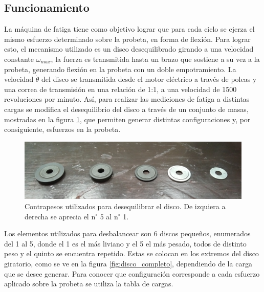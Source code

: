 \subsection{Funcionamiento}
\label{sec:funcionamiento}
La máquina de fatiga tiene como objetivo lograr que para cada ciclo se ejerza el mismo esfuerzo determinado sobre la probeta, en forma de flexión. Para lograr esto, el mecanismo utilizado es un disco desequilibrado girando a una velocidad constante $\omega_{max}$, la fuerza es transmitida hasta un brazo que sostiene a su vez a la probeta, generando flexión en la probeta con un doble empotramiento. La velocidad $\dot{\theta}$ del disco se transmitida desde el motor eléctrico a través de poleas y una correa de transmisión en una relación de 1:1, a una velocidad de 1500 revoluciones por minuto. Así, para realizar las mediciones de fatiga a distintas cargas se modifica el desequilibrio del disco a través de un conjunto de masas, mostradas en la figura \ref{fig:contrapesos}, que permiten generar distintas configuraciones y, por consiguiente, esfuerzos en la probeta.

\begin{figure}[h]
\centering
\includegraphics[width=1\linewidth]{Imagenes/contrapesos.jpg}
\caption{Contrapesos utilizados para desequilibrar el disco. De izquiera a derecha se aprecia el n$^{\circ}$ 5 al n$^{\circ}$ 1.}
\label{fig:contrapesos}
\end{figure}

Los elementos utilizados para desbalancear son 6 discos pequeños, enumerados del 1 al 5, donde el 1 es el más liviano y el 5 el más pesado, todos de distinto peso y el quinto se encuentra repetido. Estas se colocan en los extremos del disco giratorio, como se ve en la figura \ref{fig:disco_completo}, dependiendo de la carga que se desee generar. Para conocer que configuración corresponde a cada esfuerzo aplicado sobre la probeta se utiliza la tabla de cargas.

